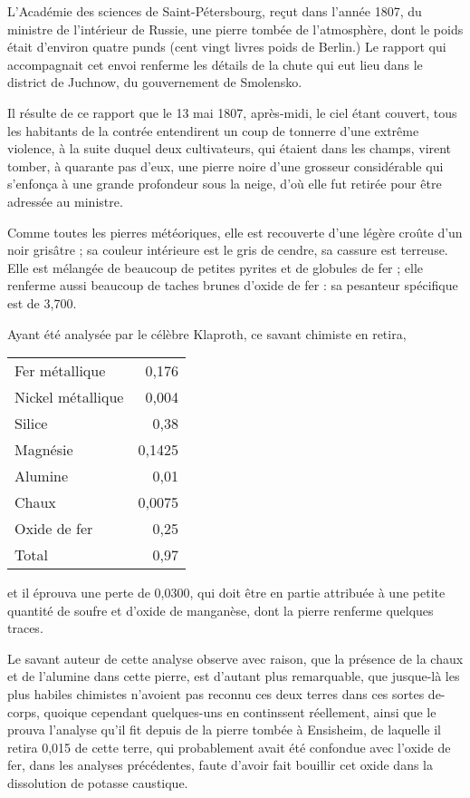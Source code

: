 \documentclass[a4paper, 12pt, oneside, french]{article}
\begin{document}
L'Académie des sciences de Saint-Pétersbourg, reçut dans l'année 1807, du ministre de l'intérieur de Russie, une pierre tombée de l'atmosphère, dont le poids était d'environ quatre punds (cent vingt livres poids de Berlin.) Le rapport qui accompagnait cet envoi renferme les détails de la chute qui eut lieu dans le district de Juchnow, du gouvernement de Smolensko.

Il résulte de ce rapport que le 13 mai 1807, après-midi, le ciel étant couvert, tous les habitants de la contrée entendirent un coup de tonnerre d'une extrême violence, à la suite duquel deux cultivateurs, qui étaient dans les champs, virent tomber, à quarante pas d'eux, une pierre noire d'une grosseur considérable qui s'enfonça à une grande profondeur sous la neige, d'où elle fut retirée pour être adressée au ministre.

Comme toutes les pierres météoriques, elle est recouverte d'une légère croûte d'un noir grisâtre ; sa couleur intérieure est le gris de cendre, sa cassure est terreuse. Elle est mélangée de beaucoup de petites pyrites et de globules de fer ; elle renferme aussi beaucoup de taches brunes d'oxide de fer : sa pesanteur spécifique est de 3,700.

Ayant été analysée par le célèbre Klaproth, ce savant chimiste en retira,
\begin{table}[H]
    \centering
    \Fontauri
    \large
    \begin{tabular}{l r}
        Fer métallique & 0,176 \\
        Nickel métallique & 0,004 \\
        Silice & 0,38 \\
        Magnésie & 0,1425 \\
        Alumine & 0,01 \\
        Chaux & 0,0075 \\
        Oxide de fer & 0,25 \\ \hline
        Total & 0,97 \\
    \end{tabular}
\end{table}
et il éprouva une perte de 0,0300, qui doit être en partie attribuée à une petite quantité de soufre et d'oxide de manganèse, dont la pierre renferme quelques traces.

Le savant auteur de cette analyse observe avec raison, que la présence de la chaux et de l'alumine dans cette pierre, est d'autant plus remarquable, que jusque-là les plus habiles chimistes n'avoient pas reconnu ces deux terres dans ces sortes de-corps, quoique cependant quelques-uns en continssent réellement, ainsi que le prouva l'analyse qu'il fit depuis de la pierre tombée à Ensisheim, de laquelle il retira 0,015 de cette terre, qui probablement avait été confondue avec l'oxide de fer, dans les analyses précédentes, faute d'avoir fait bouillir cet oxide dans la dissolution de potasse caustique.
\end{document}
